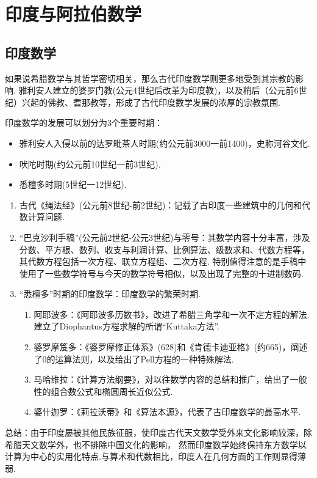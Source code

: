 \documentclass{Math_Note}
\begin{document}
\section{印度与阿拉伯数学}
\subsection{印度数学}
如果说希腊数学与其哲学密切相关，那么古代印度数学则更多地受到其宗教的影响.
雅利安人建立的婆罗门教(公元4世纪后改革为印度教)，以及稍后（公元前6世纪）兴起的佛教、耆那教等，形成了古代印度数学发展的浓厚的宗教氛围.

印度数学的发展可以划分为3个重要时期：
\begin{itemize}
    \item 雅利安人入侵以前的达罗毗茶人时期(约公元前3000一前1400)，史称河谷文化.
    \item 吠陀时期(约公元前10世纪一前3世纪).
    \item 悉檀多时期(5世纪一12世纪).
\end{itemize}

\begin{enumerate}
    \item 古代《绳法经》(公元前8世纪-前2世纪)：记载了古印度一些建筑中的几何和代数计算问题.
    \item “巴克沙利手稿”(公元前2世纪-公元3世纪)与零号：其数学内容十分丰富，涉及分数、平方根、数列、收支与利润计算、比例算法、级数求和、代数方程等，
    其代数方程包括一次方程、联立方程组、二次方程. 特别值得注意的是手稿中使用了一些数学符号与今天的数学符号相似，以及出现了完整的十进制数码. 
    \item “悉檀多”时期的印度数学：印度数学的繁荣时期. 
    \begin{enumerate}
        \item 阿耶波多：《阿耶波多历数书》，改进了希腊三角学和一次不定方程的解法. 建立了Diophantus方程求解的所谓“Kuttaka方法”.
        \item 婆罗摩笈多：《婆罗摩修正体系》(628)和《肯德卡迪亚格》(约665)，阐述了0的运算法则，以及给出了Pell方程的一种特殊解法.
        \item 马哈维拉：《计算方法纲要》，对以往数学内容的总结和推广，给出了一般性的组合数公式和椭圆周长近似公式.
        \item 婆什迦罗：《莉拉沃蒂》和《算法本源》，代表了古印度数学的最高水平.
    \end{enumerate}
\end{enumerate}

总结：由于印度屡被其他民族征服，使印度古代天文数学受外来文化影响较深，除希腊天文数学外，也不排除中国文化的影响，
然而印度数学始终保持东方数学以计算为中心的实用化特点.与算术和代数相比，印度人在几何方面的工作则显得薄弱.
\end{document}
